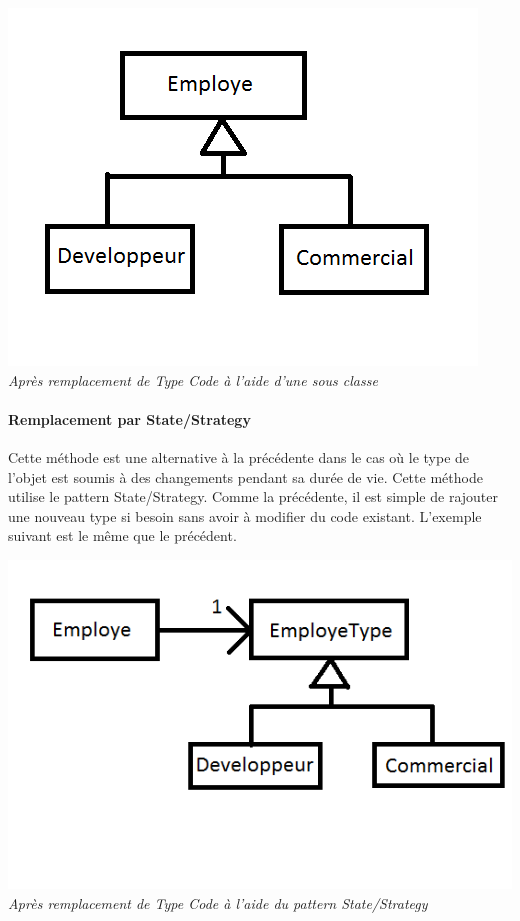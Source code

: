 \documentclass[a4paper,twoside,12pt,openright]{report}
\begin{document}
\begin{center}
\includegraphics[scale=1]{Image/TypeCode_SousClasse2.png}\\
\itshape{Après remplacement de Type Code à l'aide d'une sous classe}
\end{center}

\paragraph{Remplacement par State/Strategy}
Cette méthode est une alternative à la précédente dans le cas où le type de l'objet est soumis à des changements pendant sa durée de vie. Cette méthode utilise le pattern State/Strategy. Comme la précédente, il est simple de rajouter une nouveau type si besoin sans avoir à modifier du code existant. L'exemple suivant est le même que le précédent.

\begin{center}
\includegraphics[scale=1]{Image/TypeCode_State.png}\\
\itshape{Après remplacement de Type Code à l'aide du pattern State/Strategy}
\end{center}
\end{document}
